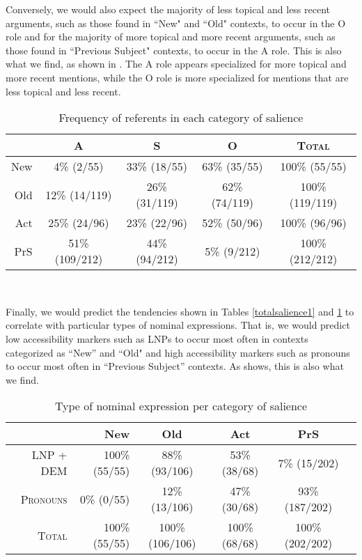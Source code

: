 Conversely, we would also expect the majority of less topical and less recent arguments, such as those found in ``New" and ``Old" contexts, to occur in the O role and for the majority of more topical and more recent arguments, such as those found in ``Previous Subject" contexts, to occur in the A role. This is also what we find, as shown in . The A role  appears specialized for more topical and more recent mentions, while the O role is more specialized for mentions that are less topical and less recent. 
\begin{table}[htp]
\begin{center}
\caption{\small{Frequency of referents in each category of salience}}
\begin{tabular}{| r | c | c | c | c |}\hline
  & \textsc{A} & \textsc{S} & \textsc{O} & \textsc{Total} \\
\hline
 New & 4{\%} (2/55) & 33{\%} (18/55) & 63{\%} (35/55)  & 100{\%} (55/55) \\
\hline
  Old & 12{\%} (14/119) & 26{\%} (31/119) & 62{\%} (74/119) & 100{\%} (119/119) \\
\hline 
  Act & 25{\%} (24/96) & 23{\%} (22/96) & 52{\%} (50/96) & 100{\%} (96/96) \\
\hline
PrS & 51{\%} (109/212) & 44{\%} (94/212) & 5{\%} (9/212) & 100{\%} (212/212) \\
\hline
\end{tabular}\\
\label{totalsalience2}
\end{center}
\end{table}


Finally, we would predict the tendencies shown in Tables \ref{totalsalience1} and \ref{totalsalience2} to correlate with particular types of nominal expressions. That is, we would predict low accessibility markers such as LNPs to occur most often in contexts categorized as ``New'' and ``Old" and high accessibility markers such as pronouns to occur most often in ``Previous Subject'' contexts. As  shows, this is also what we find.
\begin{table}[htp]
\begin{center}
\caption{\small{Type of nominal expression per category of salience}}
\begin{tabular}{| r | r | c | c | c | c |}\hline
 & New & Old & Act & PrS \\
\hline
\textsc{LNP + DEM} &  100{\%} (55/55) &  88{\%} (93/106) & 53{\%} (38/68) & 7{\%} (15/202) \\
\hline
\textsc{Pronouns} & 0{\%} (0/55) & 12{\%} (13/106) & 47{\%} (30/68) & 93{\%} (187/202) \\
\hline 
\textsc{Total} & 100{\%} (55/55) & 100{\%} (106/106) & 100{\%} (68/68) &100{\%} (202/202) \\
\hline
\end{tabular}\\
\label{saliencetype}
\end{center}
\end{table}

